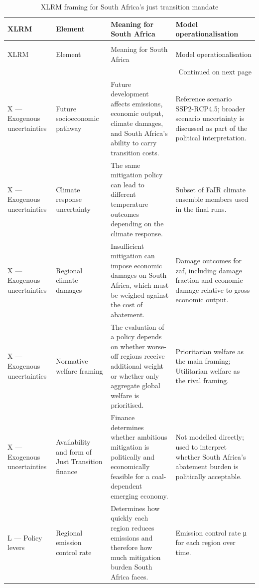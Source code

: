 \begin{longtable}{p{3.2cm} p{4.0cm} p{6.0cm} p{6.0cm}}
\caption{XLRM framing for South Africa's just transition mandate} \label{tab:xlrm_south_africa} \\
\toprule
XLRM & Element & Meaning for South Africa & Model operationalisation \\
\midrule
\endfirsthead
\caption[]{XLRM framing for South Africa's just transition mandate} \\
\toprule
XLRM & Element & Meaning for South Africa & Model operationalisation \\
\midrule
\endhead
\midrule
\multicolumn{4}{r}{Continued on next page} \\
\midrule
\endfoot
\bottomrule
\endlastfoot
X — Exogenous uncertainties & Future socioeconomic pathway & Future development affects emissions, economic output, climate damages, and South Africa's ability to carry transition costs. & Reference scenario SSP2-RCP4.5; broader scenario uncertainty is discussed as part of the political interpretation. \\
X — Exogenous uncertainties & Climate response uncertainty & The same mitigation policy can lead to different temperature outcomes depending on the climate response. & Subset of FaIR climate ensemble members used in the final runs. \\
X — Exogenous uncertainties & Regional climate damages & Insufficient mitigation can impose economic damages on South Africa, which must be weighed against the cost of abatement. & Damage outcomes for zaf, including damage fraction and economic damage relative to gross economic output. \\
X — Exogenous uncertainties & Normative welfare framing & The evaluation of a policy depends on whether worse-off regions receive additional weight or whether only aggregate global welfare is prioritised. & Prioritarian welfare as the main framing; Utilitarian welfare as the rival framing. \\
X — Exogenous uncertainties & Availability and form of Just Transition finance & Finance determines whether ambitious mitigation is politically and economically feasible for a coal-dependent emerging economy. & Not modelled directly; used to interpret whether South Africa's abatement burden is politically acceptable. \\
L — Policy levers & Regional emission control rate & Determines how quickly each region reduces emissions and therefore how much mitigation burden South Africa faces. & Emission control rate μ for each region over time. \\

\end{longtable}
